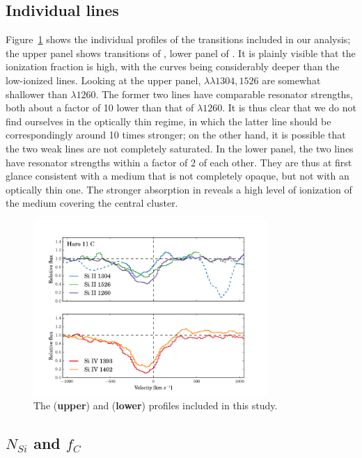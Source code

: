 \documentclass[preprint2]{aastex6}
\begin{document}
\subsection{Individual lines}\label{individual-lines}

Figure~\ref{fig:SingleLines} shows the individual profiles of the
transitions included in our analysis; the upper panel shows transitions
of , lower panel of . It is plainly visible that
the ionization fraction is high, with the  curves being
considerably deeper than the low-ionized lines. Looking at the upper
panel,  $\lambda \lambda 1304, 1526$ are somewhat shallower
than  $\lambda 1260$. The former two lines have comparable
resonator strengths, both about a factor of 10 lower than that of
$\lambda 1260$. It is thus clear that we do not find ourselves in the
optically thin regime, in which the latter line should be
correspondingly around 10 times stronger; on the other hand, it is
possible that the two weak lines are not completely saturated. In the
lower panel, the two lines have resonator strengths within a factor of 2
of each other. They are thus at first glance consistent with a medium
that is not completely opaque, but not with an optically thin one. The
stronger absorption in  reveals a high level of ionization of
the medium covering the central cluster.

\begin{figure}
\centering
\includegraphics[width=3.500in]{../Figs/HISLISProfiles.pdf}
\caption{The  (\textbf{upper}) and 
(\textbf{lower}) profiles included in this
study.}\label{fig:SingleLines}
\end{figure}

\subsection{$N_{Si}$ and $f_C$}\label{sec:aod}
\end{document}
